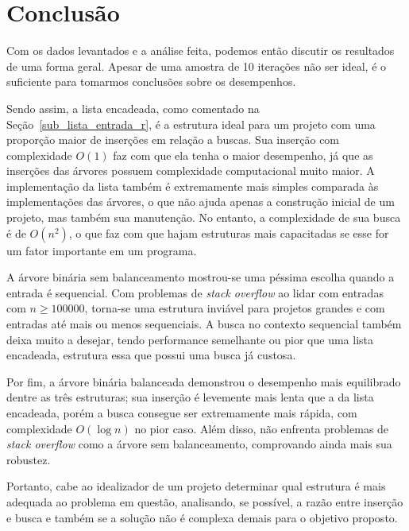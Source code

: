 \chapter*{Conclusão}\label{cap-conclusao}

Com os dados levantados e a análise feita, podemos então discutir os resultados de uma forma geral. Apesar de uma amostra de 10 iterações não ser ideal, é o suficiente para tomarmos conclusões sobre os desempenhos.

Sendo assim, a lista encadeada, como comentado na Seção~\ref{sub_lista_entrada_r}, é a estrutura ideal para um projeto com uma proporção maior de inserções em relação a buscas. Sua inserção com complexidade $O(1)$ faz com que ela tenha o maior desempenho, já que as inserções das árvores possuem complexidade computacional muito maior. A implementação da lista também é extremamente mais simples comparada às implementações das árvores, o que não ajuda apenas a construção inicial de um projeto, mas também sua manutenção. No entanto, a complexidade de sua busca é de $O(n^2)$, o que faz com que hajam estruturas mais capacitadas se esse for um fator importante em um programa. 

A árvore binária sem balanceamento mostrou-se uma péssima escolha quando a entrada é sequencial. Com problemas de \textit{stack overflow} ao lidar com entradas com $n \geq 100000$, torna-se uma estrutura inviável para projetos grandes e com entradas até mais ou menos sequenciais. A busca no contexto sequencial também deixa muito a desejar, tendo performance semelhante ou pior que uma lista encadeada, estrutura essa que possui uma busca já custosa.

Por fim, a árvore binária balanceada demonstrou o desempenho mais equilibrado dentre as três estruturas; sua inserção é levemente mais lenta que a da lista encadeada, porém a busca consegue ser extremamente mais rápida, com complexidade $O(\log{n})$ no pior caso. Além disso, não enfrenta problemas de \textit{stack overflow} como a árvore sem balanceamento, comprovando ainda mais sua robustez.

Portanto, cabe ao idealizador de um projeto determinar qual estrutura é mais adequada ao problema em questão, analisando, se possível, a razão entre inserção e busca e também se a solução não é complexa demais para o objetivo proposto.